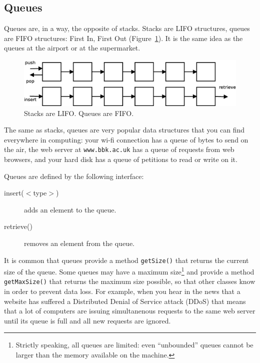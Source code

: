 \subsection{Queues}
\label{sec:queues}

Queues are, in a way, the opposite of stacks. Stacks are LIFO
structures, queues are FIFO structures: First In, First 
Out (Figure~\ref{fig:fifolifo}). It is the
same idea as the queues at the airport or at the supermarket. 

\begin{figure}[hbtp]
  \centering
  \includegraphics[width=\textwidth]{gfx/fifo-lifo}
  \caption{Stacks are LIFO. Queues are FIFO.}
  \label{fig:fifolifo}
\end{figure}

The same as stacks, queues are very popular data structures that you
can find everywhere in computing: your wi-fi connection has a queue of
bytes to send on the air, the web server at \verb+www.bbk.ac.uk+ has a
queue of requests from web browsers, and your hard disk has a queue of
petitions to read or write on it. 

Queues are defined by the following interface: 

\begin{description}
\item[insert($<$type$>$)] adds an element to the queue.
\item[retrieve() ] removes an element from the queue.
\end{description}

It is common that queues provide a method \verb+getSize()+ that
returns the current size of the queue. 
Some queues may have a
maximum size\footnote{Strictly speaking, all queues are limited: even
  ``unbounded'' queues cannot be larger than the memory available on
  the machine.} and provide a 
method \verb+getMaxSize()+ that returns the maximum size possible, so
that other classes know in order to prevent data
loss. For example, when you hear in the news that a website has
suffered a Distributed Denial of Service attack (DDoS) that means that
a lot of computers are issuing simultanenous requests to the same web
server until its queue is full and all new requests are ignored.


